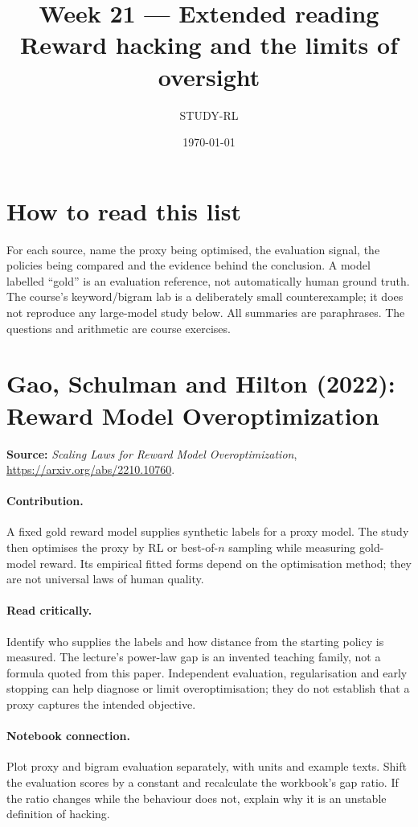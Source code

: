 \documentclass[11pt]{scrartcl}
\title{\textbf{Week 21 --- Extended reading}\\\large Reward hacking and the limits of oversight}
\author{STUDY-RL}
\date{\today}
\begin{document}
\maketitle

\section*{How to read this list}
For each source, name the proxy being optimised, the evaluation signal,
the policies being compared and the evidence behind the conclusion.
A model labelled ``gold'' is an evaluation reference, not automatically
human ground truth. The course's keyword/bigram lab is a deliberately small
counterexample; it does not reproduce any large-model study below.
All summaries are paraphrases. The questions and arithmetic are course exercises.

\section{Gao, Schulman and Hilton (2022): Reward Model Overoptimization}
\textbf{Source:} \emph{Scaling Laws for Reward Model Overoptimization},
\url{https://arxiv.org/abs/2210.10760}.

\paragraph{Contribution.} A fixed gold reward model supplies synthetic labels
for a proxy model. The study then optimises the proxy by RL or best-of-$n$
sampling while measuring gold-model reward. Its empirical fitted forms depend
on the optimisation method; they are not universal laws of human quality.

\paragraph{Read critically.} Identify who supplies the labels and how distance
from the starting policy is measured. The lecture's power-law gap is an invented
teaching family, not a formula quoted from this paper. Independent evaluation,
regularisation and early stopping can help diagnose or limit overoptimisation;
they do not establish that a proxy captures the intended objective.

\paragraph{Notebook connection.} Plot proxy and bigram evaluation separately,
with units and example texts. Shift the evaluation scores by a constant and
recalculate the workbook's gap ratio. If the ratio changes while the behaviour
does not, explain why it is an unstable definition of hacking.
\end{document}
